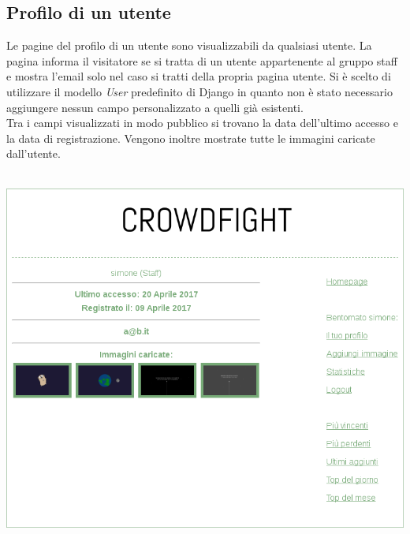 \documentclass{scrreprt}
\begin{document}
\subsection{Profilo di un utente}
Le pagine del profilo di un utente sono visualizzabili da qualsiasi utente. La pagina informa il visitatore se si tratta di un utente appartenente al gruppo staff e mostra l'email solo nel caso si tratti della propria pagina utente.
Si è scelto di utilizzare il modello \textit{User} predefinito di Django in quanto non è stato necessario aggiungere nessun campo personalizzato a quelli già esistenti.\\
Tra i campi visualizzati in modo pubblico si trovano la data dell'ultimo accesso e la data di registrazione.
Vengono inoltre mostrate tutte le immagini caricate dall'utente.
\\\\
\centerline{\includegraphics[scale=0.46]{profile}}
\\\\

\pagebreak
\end{document}
